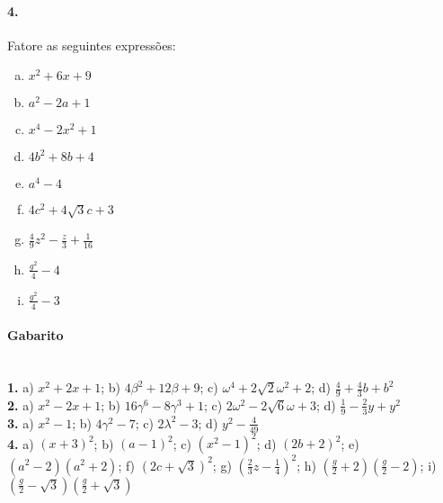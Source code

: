 \documentclass[a4paper,12pt]{article}
\begin{document}
\begin{multicols}{2}
\paragraph{4.} Fatore as seguintes expressões:
\begin{enumerate}[a)]
\item $x^2 + 6x + 9$
\item $a^2 - 2a + 1$
\item $x^4 - 2x^2 + 1$
\item $4b^2 + 8b + 4$ 
\item $a^4 - 4$
\item $4c^2 + 4\sqrt{3}c + 3$
\item $\displaystyle \frac{4}{9}z^2 - \frac{z}{3} + \frac{1}{16}$
\item $\displaystyle \frac{g^2}{4} - 4$ 
\item $\displaystyle \frac{g^2}{4} - 3$ 
\end{enumerate}
\vspace*{3cm}
\end{multicols}
 
\vspace*{\fill}
{\footnotesize
\paragraph*{Gabarito} \hspace*{\fill}\\
\textbf{1.} a) $x^2 + 2x + 1$; b) $4\beta^2 + 12\beta + 9$; c) $\omega^4 + 2\sqrt{2}\omega^2 + 2$; d) $\frac{4}{9} + \frac{4}{3}b + b^2$\\
\textbf{2.} a) $x^2 - 2x + 1$; b) $16\gamma^6 - 8\gamma^3 + 1$; c) $2\omega^2 - 2\sqrt{6}\omega + 3$; d) $\frac{1}{9} - \frac{2}{3}y + y^2$\\
\textbf{3.} a) $x^2 - 1$; b) $4\gamma^2 - 7$; c) $2\lambda^2 - 3$; d) $y^2 - \frac{4}{49}$\\
\textbf{4.} a) $(x + 3)^2$; b) $(a-1)^2 $; c) $(x^2 - 1)^2$; d) $(2b + 2)^2$; e) $(a^2 - 2)(a^2 + 2)$; f) $(2c + \sqrt{3})^2$; g) $\left(\frac{2}{3}z - \frac{1}{4}\right)^2$; h) $\left(\frac{g}{2} + 2\right)\left(\frac{g}{2} - 2\right)$; i) $\left(\frac{g}{2} - \sqrt{3}\right)\left(\frac{g}{2} + \sqrt{3}\right)$
}
\end{document}
